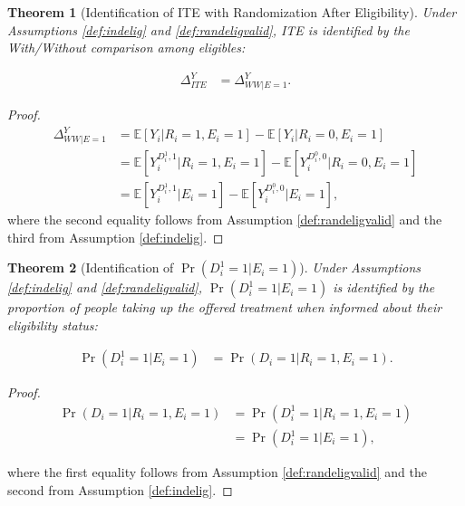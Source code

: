 \documentclass[
]{book}
\newcommand{\esp}[1]{\mathbb{E}[ #1 ]}
\newtheorem{theorem}{Theorem}[chapter]
\theoremstyle{definition}
\theoremstyle{definition}
\theoremstyle{definition}
\theoremstyle{definition}
\theoremstyle{remark}
\begin{document}
\begin{theorem}[Identification of ITE with Randomization After Eligibility]
\protect\hypertarget{thm:ITERAE}{}{\label{thm:ITERAE} \iffalse (Identification of ITE with Randomization After Eligibility) \fi{} }Under Assumptions \ref{def:indelig} and \ref{def:randeligvalid}, ITE is identified by the With/Without comparison among eligibles:

\begin{align*}
  \Delta^Y_{ITE} & = \Delta^Y_{WW|E=1}.
\end{align*}
\end{theorem}

\begin{proof}
\iffalse{} {Proof. } \fi{}\begin{align*}
 \Delta^Y_{WW|E=1} & =\esp{Y_i|R_i=1,E_i=1}-\esp{Y_i|R_i=0,E_i=1} \\
                   & = \esp{Y_i^{D_i^1,1}|R_i=1,E_i=1}-\esp{Y_i^{D_i^0,0}|R_i=0,E_i=1} \\
                    & = \esp{Y_i^{D_i^1,1}|E_i=1}-\esp{Y_i^{D_i^0,0}|E_i=1},
\end{align*}
where the second equality follows from Assumption \ref{def:randeligvalid} and the third from Assumption \ref{def:indelig}.
\end{proof}

\begin{theorem}[Identification of $\Pr(D^1_i=1|E_i=1)$]
\protect\hypertarget{thm:prRAE}{}{\label{thm:prRAE} \iffalse (Identification of \(\Pr(D^1_i=1|E_i=1)\)) \fi{} }Under Assumptions \ref{def:indelig} and \ref{def:randeligvalid}, \(\Pr(D^1_i=1|E_i=1)\) is identified by the proportion of people taking up the offered treatment when informed about their eligibility status:

\begin{align*}
  \Pr(D^1_i=1|E_i=1) & = \Pr(D_i=1|R_i=1,E_i=1).
\end{align*}
\end{theorem}

\begin{proof}
\iffalse{} {Proof. } \fi{}
\begin{align*}
 \Pr(D_i=1|R_i=1,E_i=1) & =\Pr(D^1_i=1|R_i=1,E_i=1) \\
                        & = \Pr(D^1_i=1|E_i=1),
\end{align*}

where the first equality follows from Assumption \ref{def:randeligvalid} and the second from Assumption \ref{def:indelig}.
\end{proof}
\end{document}
